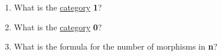 \begin{enumerate}
    \item What is the \href{doc/1 math/Seven Sketches in Compositionality/Chapter 3: Databases/2 Categories/1 Free Categories/2 Free category on a graph}{category} \textbf{1}?
    \item What is the \href{doc/1 math/Seven Sketches in Compositionality/Chapter 3: Databases/2 Categories/1 Free Categories/2 Free category on a graph}{category} \textbf{0}?
    \item What is the formula for the number of morphisms in \textbf{n}?

  \end{enumerate}